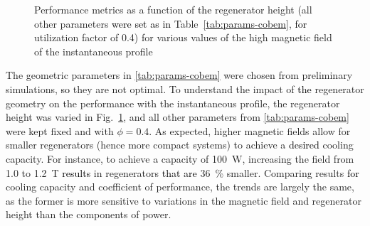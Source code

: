 \documentclass[referee]{svjour3}
\begin{document}
\begin{figure}[!ht]
  \centering
\quad
  \caption{Performance metrics as a function of \textcolor{black}{the} regenerator height (all other parameters \textcolor{black}{were set as in} Table~\ref{tab:params-cobem}, \textcolor{black}{for}  utilization factor of 0.4) for various values of the high magnetic field of the instantaneous profile}
\label{fig:Qc_H_inst}
\end{figure}

The geometric parameters in \autoref{tab:params-cobem} were chosen from preliminary simulations, \textcolor{black}{so} they are not  optimal. To understand the impact of \textcolor{black}{the} regenerator geometry on the performance with the instantaneous profile, the regenerator height was varied in Fig.~\ref{fig:Qc_H_inst}, and all other parameters from \autoref{tab:params-cobem} were kept fixed and with $\phi=0.4$. As expected, higher magnetic fields allow for smaller regenerators (hence more compact systems) to achieve a \textcolor{black}{desired} cooling capacity. For instance, to achieve a capacity of \SI{100}{\watt}, increasing the field from \num{1.0} to \SI{1.2}{\tesla} \textcolor{black}{results} in regenerators \textcolor{black}{that are} \SI{36}{\percent} smaller. Comparing results \textcolor{black}{for} cooling capacity and coefficient of performance, the trends are largely the same, as the former is more sensitive to variations in the magnetic field and regenerator height than the components of power.
\end{document}
